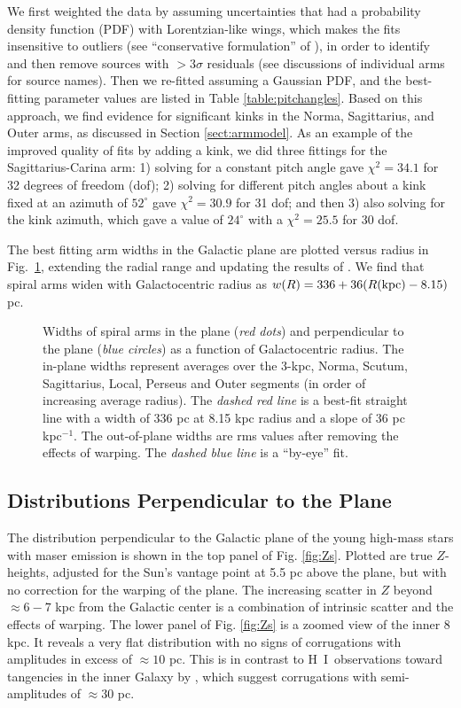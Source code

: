 \documentclass[12pt,preprint]{aastex}
\def\HI   {H~{\small I}}
\begin{document}
We first weighted the data by assuming uncertainties that had a probability density 
function (PDF) with Lorentzian-like wings, which makes the fits insensitive to 
outliers (see ``conservative formulation'' of \citet{Sivia:06}), in order to identify 
and then remove sources with $>3\sigma$ residuals (see discussions of individual arms
for source names).  Then we re-fitted assuming a Gaussian PDF, and the best-fitting 
parameter values are listed in Table \ref{table:pitchangles}.
Based on this approach, we find evidence for significant kinks in the Norma, 
Sagittarius, and Outer arms, as discussed in Section \ref{sect:armmodel}.
As an example of the improved
quality of fits by adding a kink, we did three fittings for the Sagittarius-Carina arm:
1) solving for a constant pitch angle gave $\chi^2 = 34.1$ for 32 degrees of freedom (dof);
2) solving for different pitch angles about a kink fixed at an azimuth of $52^\circ$
gave $\chi^2 = 30.9$ for 31 dof; and then 3) also solving for the kink azimuth, which 
gave a value of $24^\circ$ with a $\chi^2 = 25.5$ for 30 dof.


The best fitting arm widths in the Galactic plane are plotted versus radius in 
Fig.~\ref{fig:armwid}, extending the radial range and updating the results of 
\citet{Reid:14}.  We find that spiral arms widen with Galactocentric radius as 
$w(R) = 336 + 36( R({\rm kpc}) - 8.15 )$ pc.

\begin{figure}[htp]
\caption{\small Widths of spiral arms in the plane ({\it red dots}) and
perpendicular to the plane ({\it blue circles}) as a function
of Galactocentric radius.  The in-plane widths represent averages over the 3-kpc, 
Norma, Scutum, Sagittarius, Local, Perseus and Outer segments 
(in order of increasing average radius).  
The {\it dashed red line} is a best-fit straight line
with a width of 336 pc at 8.15 kpc radius and a slope of 36 pc kpc$^{-1}$.
The out-of-plane widths are rms values after removing the effects of warping.
The {\it dashed blue line} is a ``by-eye'' fit.
        }
\label{fig:armwid}
\end{figure}

\subsection{Distributions Perpendicular to the Plane}

The distribution perpendicular to the Galactic plane of the young high-mass 
stars with maser emission is shown in the top panel of Fig. \ref{fig:Zs}.
Plotted are true $Z$-heights, adjusted for the Sun's vantage point at 5.5 pc 
above the plane, but with no correction for the warping of the plane.
The increasing scatter in $Z$ beyond $\approx6-7$ kpc from the Galactic center
is a combination of intrinsic scatter and the effects of warping.  
The lower panel of Fig. \ref{fig:Zs} is a zoomed view of the inner 8 kpc.
It reveals a very flat distribution with no signs of corrugations with
amplitudes in excess of $\approx10$ pc.   This is in contrast to \HI\ 
observations toward tangencies in the inner Galaxy by \citet{Malhotra:95},
which suggest corrugations with semi-amplitudes of $\approx30$ pc. 
\end{document}
